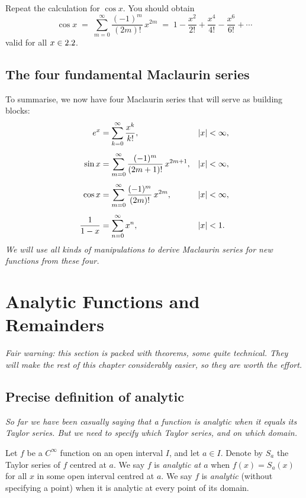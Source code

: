 \begin{remark}
Repeat the calculation for $\cos x$.  You should obtain
\[
  \cos x \;=\; \sum_{m=0}^{\infty}\frac{(-1)^{m}}{(2m)!}\,x^{2m}
  \;=\; 1 - \frac{x^{2}}{2!} + \frac{x^{4}}{4!} - \frac{x^{6}}{6!} + \cdots
\]
valid for all $x\in2.2$.
\end{remark}

\subsection*{The four fundamental Maclaurin series}

To summarise, we now have four Maclaurin series that will serve as building blocks:
\begin{align*}
  e^{x}           &= \sum_{k=0}^{\infty}\frac{x^{k}}{k!},            & \left\lvert x \right\rvert&<\infty, \\[4pt]
  \sin x          &= \sum_{m=0}^{\infty}\frac{(-1)^{m}}{(2m+1)!}\,x^{2m+1}, & \left\lvert x \right\rvert&<\infty, \\[4pt]
  \cos x          &= \sum_{m=0}^{\infty}\frac{(-1)^{m}}{(2m)!}\,x^{2m},     & \left\lvert x \right\rvert&<\infty, \\[4pt]
  \frac{1}{1-x}   &= \sum_{n=0}^{\infty}x^{n},                        & \left\lvert x \right\rvert&<1.
\end{align*}
\textit{We will use all kinds of manipulations to derive Maclaurin series for new functions from these four.}

\section{Analytic Functions and Remainders}
\label{sec:14.7}

\textit{Fair warning: this section is packed with theorems, some quite technical.  They will make the rest of this chapter considerably easier, so they are worth the effort.}

\subsection*{Precise definition of analytic}

\textit{So far we have been casually saying that a function is analytic when it equals its Taylor series.  But we need to specify \emph{which} Taylor series, and on which domain.}

\begin{definition}
\label{def:14-10}
Let $f$ be a $C^{\infty}$ function on an open interval $I$, and let $a\in I$.  Denote by $S_{a}$ the Taylor series of $f$ centred at $a$.  We say $f$ is \emph{analytic at $a$} when $f(x)=S_{a}(x)$ for all $x$ in some open interval centred at $a$.  We say $f$ is \emph{analytic} (without specifying a point) when it is analytic at every point of its domain.
\end{definition}

